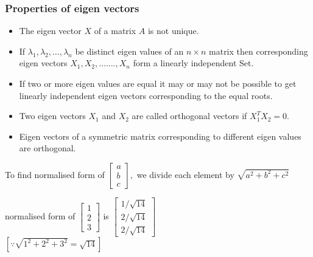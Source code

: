 \subsubsection{Properties of eigen vectors}
\begin{itemize}
	\item The eigen vector $X$ of a matrix $A$ is not unique.
	\item  If $\lambda_{1}, \lambda_{2}, \ldots, \lambda_{n}$ be distinct eigen values of an $n \times n$ matrix then corresponding eigen vectors $X_{1}, X_{2}, \ldots \ldots ., X_{n}$ form a linearly independent Set.
	\item If two or more eigen values are equal it may or may not be possible to get linearly independent eigen vectors corresponding to the equal roots.
	\item  Two eigen vectors $X_{1}$ and $X_{2}$ are called orthogonal vectors if $X_{1}^{T} X_{2}=0$.
	\item Eigen vectors of a symmetric matrix corresponding to different eigen values are orthogonal.
	
\end{itemize}
\begin{note}
	  To find normalised form of $\left[\begin{array}{l}a \\ b \\ c\end{array}\right],$ we divide each element by $\sqrt{a^{2}+b^{2}+c^{2}}$
	  \begin{exampleT}
	  	normalised form of $\left[\begin{array}{l}1 \\ 2 \\ 3\end{array}\right]$ is $\left[\begin{array}{l}1 / \sqrt{14} \\ 2 / \sqrt{14} \\ 2 / \sqrt{14}\end{array}\right]$\\$ \left[ \because \sqrt {1^{2}+2^{2}+3^{2}}=\sqrt{14}\right]$
	  \end{exampleT}
\end{note} 

